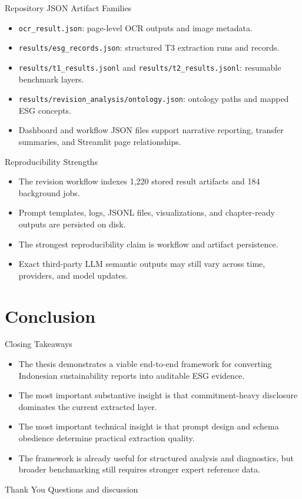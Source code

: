 \documentclass[aspectratio=169]{beamer}
\begin{document}
\begin{frame}{Repository JSON Artifact Families}
  \begin{itemize}
    \item \texttt{ocr\_result.json}: page-level OCR outputs and image metadata.
    \item \texttt{results/esg\_records.json}: structured T3 extraction runs and records.
    \item \texttt{results/t1\_results.jsonl} and \texttt{results/t2\_results.jsonl}: resumable benchmark layers.
    \item \texttt{results/revision\_analysis/ontology.json}: ontology paths and mapped ESG concepts.
    \item Dashboard and workflow JSON files support narrative reporting, transfer summaries, and Streamlit page relationships.
  \end{itemize}
\end{frame}

\begin{frame}{Reproducibility Strengths}
  \begin{itemize}
    \item The revision workflow indexes 1{,}220 stored result artifacts and 184 background jobs.
    \item Prompt templates, logs, JSONL files, visualizations, and chapter-ready outputs are persisted on disk.
    \item The strongest reproducibility claim is workflow and artifact persistence.
    \item Exact third-party LLM semantic outputs may still vary across time, providers, and model updates.
  \end{itemize}
\end{frame}

\section{Conclusion}

\begin{frame}{Closing Takeaways}
  \begin{itemize}
    \item The thesis demonstrates a viable end-to-end framework for converting Indonesian sustainability reports into auditable ESG evidence.
    \item The most important substantive insight is that commitment-heavy disclosure dominates the current extracted layer.
    \item The most important technical insight is that prompt design and schema obedience determine practical extraction quality.
    \item The framework is already useful for structured analysis and diagnostics, but broader benchmarking still requires stronger expert reference data.
  \end{itemize}
\end{frame}

\begin{frame}{Thank You}
  \centering
  Questions and discussion
\end{frame}
\end{document}
